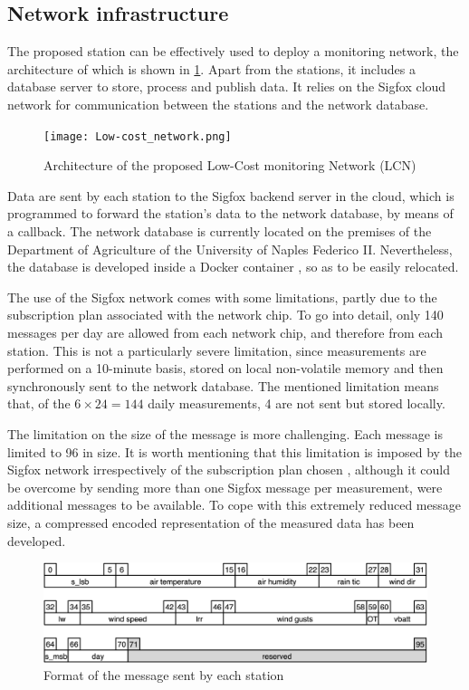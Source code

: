 \documentclass[conference]{IEEEtran}
\begin{document}
\subsection{Network infrastructure}
The proposed station can be effectively used to deploy a monitoring network, the architecture of which is shown in \cref{fig:network}. 
Apart from the stations, it includes a database server to store, process and publish data. 
It relies on the Sigfox cloud network \cite{sigfox:network-architecture} for communication between the stations and the network database.

\begin{figure}
    \centering
    \texttt{[image: Low-cost\_network.png]}
    \caption{Architecture of the proposed Low-Cost monitoring Network (LCN)}
    \label{fig:network}
\end{figure}
Data are sent by each station to the Sigfox backend server in the cloud, which is programmed to forward the station's data to the network database, by means of a callback. The network database is currently located on the premises of the Department of Agriculture of the University of Naples Federico II. 
Nevertheless, the database is developed inside a Docker container \cite{docker:mainpage}, so as to be easily relocated.

The use of the Sigfox network comes with some limitations, partly due to the subscription plan associated with the network chip.
To go into detail, only 140 messages per day are allowed from each network chip, and therefore from each station. 
This is not a particularly severe limitation, since measurements are performed on a 10-minute basis, stored on local non-volatile memory and then synchronously sent to the network database. 
The mentioned limitation means that, of the  \(6\times 24 = 144\) daily measurements, 4 are not sent but stored locally.

The limitation on the size of the message is more challenging. 
Each message is limited to \SI{96}{\bit} in size. 
It is worth mentioning that this limitation is imposed by the Sigfox network irrespectively of the subscription plan chosen \cite{sigfox:network-architecture}, although it could be overcome by sending more than one Sigfox message per measurement, were additional messages to be available. 
To cope with this extremely reduced message size, a compressed encoded representation of the measured data has been developed. 

\begin{figure}
    \centering
    \includegraphics[scale=.55]{message_format.png}
    \caption{Format of the message sent by each station}
    \label{fig:message-format}
\end{figure}
\end{document}
